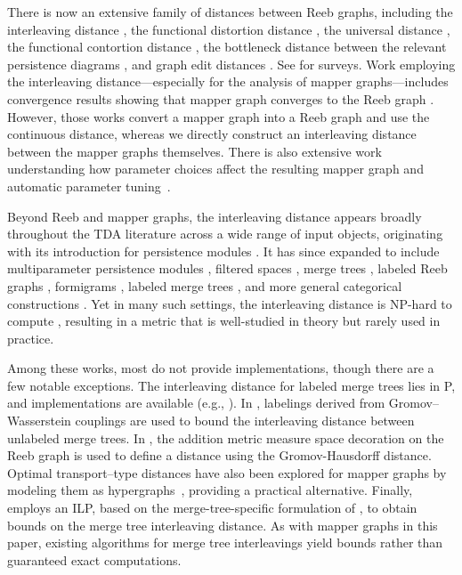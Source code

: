 There is now an extensive family of distances between Reeb graphs, including 
the interleaving distance \cite{Chambers2021,deSilva2016}, 
the functional distortion distance \cite{Bauer2013}, 
the universal distance \cite{Bauer2022,Bauer2020}, 
the functional contortion distance \cite{Bauer2022}, 
the bottleneck distance between the relevant persistence diagrams \cite{Carriere2017}, 
and graph edit distances \cite{Bauer2016, Bauer2020}. 
See \cite{Bollen2021,Yan2021a} for surveys. 
Work employing the interleaving distance---especially for the analysis of mapper graphs---includes convergence results showing that mapper graph converges to the Reeb graph \cite{Brown2020,Munch2016,Oulhaj2025}.
However, those works convert a mapper graph into a Reeb graph and use the continuous distance, whereas we directly construct an interleaving distance between the mapper graphs themselves.
There is also extensive work understanding how parameter choices affect the resulting mapper graph \cite{Carriere2018,Carriere2017b} and automatic parameter tuning~\cite{alvarado2025gmapper,chalapathi2021adaptive}. 

Beyond Reeb and mapper graphs, the interleaving distance appears broadly throughout the TDA literature across a wide range of input objects, originating with its introduction for persistence modules \cite{Chazal2009}. 
It has since expanded to include 
multiparameter persistence modules \cite{Berkouk2021,Lesnick2015}, 
filtered spaces \cite{Blumberg2023}, 
merge trees \cite{Beurskens2023,Morozov2013}, 
labeled Reeb graphs \cite{Lan2024},
formigrams \cite{Kim2023a}, 
labeled merge trees \cite{Curry2022,Gasparovic2024,Munch2019, Yan2019}, 
and more general categorical constructions \cite{Botnan2020,Cruz2019,deSilva2018,Kim2023,Meehan2017,Scoccola2020}.
Yet in many such settings, the interleaving distance is NP-hard to compute \cite{bjerkevik2020computing,bjerkevik2017computational}, resulting in a metric that is well-studied in theory but rarely used in practice. 

Among these works, most do not provide implementations, though there are a few notable exceptions. The interleaving distance for labeled merge trees \cite{Munch2019} lies in P, and implementations are available (e.g., \cite{Yan2019}). In \cite{Curry2022}, labelings derived from Gromov--Wasserstein couplings are used to bound the interleaving distance between unlabeled merge trees. 
In \cite{Chambers2025}, the addition metric measure space decoration on the Reeb graph is used to define a distance using the Gromov-Hausdorff distance.
Optimal transport--type distances have also been explored for mapper graphs by modeling them as hypergraphs~\cite{zhou2023comparing}, providing a practical alternative. Finally, \cite{Pegoraro2021} employs an ILP, based on the merge-tree-specific formulation of \cite{FarahbakhshTouli2019}, to obtain bounds on the merge tree interleaving distance. As with mapper graphs in this paper, existing algorithms for merge tree interleavings yield bounds rather than guaranteed exact computations.



